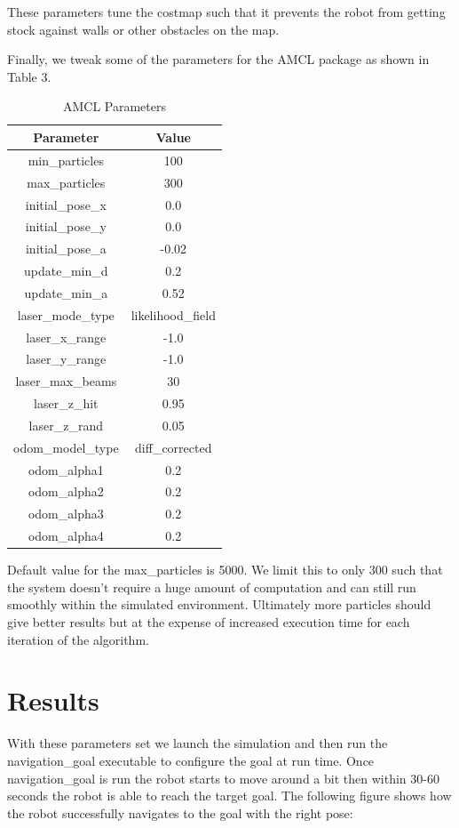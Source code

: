 \documentclass[10pt,journal,compsoc]{IEEEtran}
\begin{document}
These parameters tune the costmap such that it prevents the robot from getting stock against walls or other obstacles on the map.

Finally, we tweak some of the parameters for the AMCL package \cite{ros-amcl} as shown in Table 3.
\begin{table}[h]
\caption{AMCL Parameters}
\label{table_example}
\begin{center}
\begin{tabular}{|c||c|}
\hline
Parameter & Value\\
\hline
min\_particles & 100 \\
\hline
max\_particles & 300 \\
\hline
initial\_pose\_x & 0.0 \\
\hline
initial\_pose\_y & 0.0 \\
\hline
initial\_pose\_a & -0.02 \\
\hline
update\_min\_d & 0.2 \\
\hline
update\_min\_a & 0.52 \\
\hline
laser\_mode\_type & likelihood\_field \\
\hline
laser\_x\_range & -1.0 \\
\hline
laser\_y\_range & -1.0 \\
\hline
laser\_max\_beams & 30 \\
\hline
laser\_z\_hit & 0.95 \\
\hline
laser\_z\_rand & 0.05 \\
\hline
odom\_model\_type & diff\_corrected \\
\hline
odom\_alpha1 & 0.2 \\
\hline
odom\_alpha2 & 0.2 \\
\hline
odom\_alpha3 & 0.2 \\
\hline
odom\_alpha4 & 0.2 \\
\hline
\end{tabular}
\end{center}
\end{table}

Default value for the max\_particles is 5000. We limit this to only 300 such that the system doesn't require a huge amount of computation and can still run smoothly within the simulated environment. Ultimately more particles should give better results but at the expense of increased execution time for each iteration of the algorithm.

\section{Results}
With these parameters set we launch the simulation and then run the navigation\_goal executable to configure the goal at run time. Once navigation\_goal is run the robot starts to move around a bit then within 30-60 seconds the robot is able to reach the target goal.
The following figure shows how the robot successfully navigates to the goal with the right pose:
\end{document}
